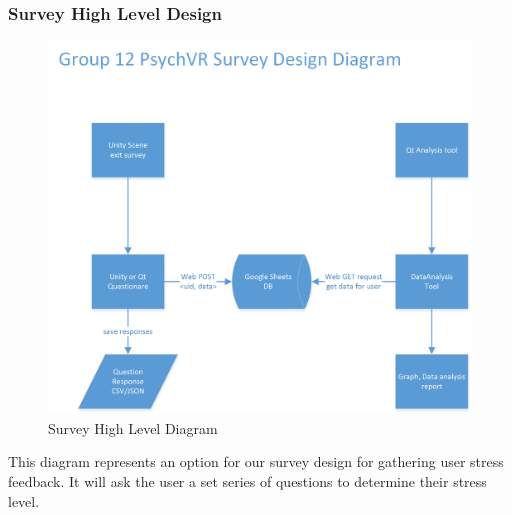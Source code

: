 \documentclass[a4paper,10pt]{article}
\begin{document}
		\subsubsection{Survey High Level Design}
			\begin{figure}[H]
					\centerline{\includegraphics[]{survey.png}}
					\caption{Survey High Level Diagram}
					\label{fig:surveyDiag}
				\end{figure}
				This diagram represents an option for our survey design for gathering user stress feedback. It will ask the user a set series of questions to determine their stress level.
\pagebreak
\end{document}

